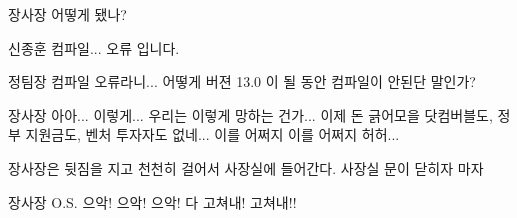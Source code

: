 \documentclass{screenplay}
\begin{document}
    \begin{dialogue}{장사장}
        어떻게 됐나?
    \end{dialogue}
    \begin{dialogue}{신종훈}
        컴파일... 오류 입니다.
    \end{dialogue}
    \begin{dialogue}{정팀장}
        컴파일 오류라니... 어떻게 버젼 13.0 이 될 동안 컴파일이 안된단 말인가?
    \end{dialogue}
    \begin{dialogue}{장사장}
        아아... 이렇게... 우리는 이렇게 망하는 건가... 이제 돈 긁어모을 닷컴버블도, 정부 지원금도, 벤처 투자자도 없네... 이를 어쩌지 이를 어쩌지 허허...
    \end{dialogue}
    
    장사장은 뒷짐을 지고 천천히 걸어서 사장실에 들어간다. 사장실 문이 닫히자 마자
    
    \begin{dialogue}{장사장}
        O.S. 으악! 으악! 으악! 다 고쳐내! 고쳐내!!
    \end{dialogue}
    
\end{document}
